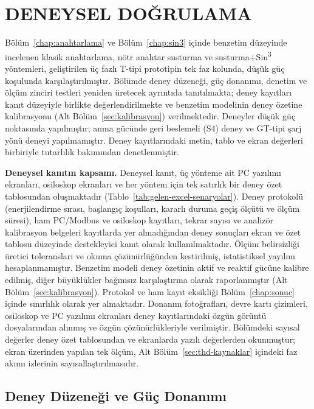 \chapter{DENEYSEL DOĞRULAMA}
\label{chap:deney}

Bölüm~\ref{chap:anahtarlama} ve Bölüm~\ref{chap:sin3} içinde benzetim düzeyinde incelenen klasik anahtarlama, nötr anahtar susturma ve susturma+Sin\textsuperscript{3} yöntemleri, geliştirilen üç fazlı T-tipi prototipin tek faz kolunda, düşük güç koşulunda karşılaştırılmıştır. Bölümde deney düzeneği, güç donanımı, denetim ve ölçüm zinciri testleri yeniden üretecek ayrıntıda tanıtılmakta; deney kayıtları kanıt düzeyiyle birlikte değerlendirilmekte ve benzetim modelinin deney özetine kalibrasyonu (Alt Bölüm~\ref{sec:kalibrasyon}) verilmektedir. Deneyler düşük güç noktasında yapılmıştır; anma gücünde geri beslemeli (S4) deney ve GT-tipi şarj yönü deneyi yapılmamıştır. Deney kayıtlarındaki metin, tablo ve ekran değerleri birbiriyle tutarlılık bakımından denetlenmiştir.

\textbf{Deneysel kanıtın kapsamı.} Deneysel kanıt, üç yönteme ait PC yazılımı ekranları, osiloskop ekranları ve her yöntem için tek satırlık bir deney özet tablosundan oluşmaktadır (Tablo~\ref{tab:gelen-excel-senaryolar}). Deney protokolü (enerjilendirme sırası, başlangıç koşulları, kararlı duruma geçiş ölçütü ve ölçüm süresi), ham PC/Modbus ve osiloskop kayıtları, tekrar sayısı ve analizör kalibrasyon belgeleri kayıtlarda yer almadığından deney sonuçları ekran ve özet tablosu düzeyinde destekleyici kanıt olarak kullanılmaktadır. Ölçüm belirsizliği üretici toleransları ve okuma çözünürlüğünden kestirilmiş, istatistiksel yayılım hesaplanmamıştır. Benzetim modeli deney özetinin aktif ve reaktif gücüne kalibre edilmiş, diğer büyüklükler bağımsız karşılaştırma olarak raporlanmıştır (Alt Bölüm~\ref{sec:kalibrasyon}). Protokol ve ham kayıt eksikliği Bölüm~\ref{chap:sonuc} içinde sınırlılık olarak yer almaktadır. Donanım fotoğrafları, devre kartı çizimleri, osiloskop ve PC yazılımı ekranları deney kayıtlarındaki özgün görüntü dosyalarından alınmış ve özgün çözünürlükleriyle verilmiştir. Bölümdeki sayısal değerler deney özet tablosundan ve ekranlarda yazılı değerlerden okunmuştur; ekran üzerinden yapılan tek ölçüm, Alt Bölüm~\ref{sec:thd-kaynaklar} içindeki faz akımı izlerinin sayısallaştırılmasıdır.

\section{Deney Düzeneği ve Güç Donanımı}

